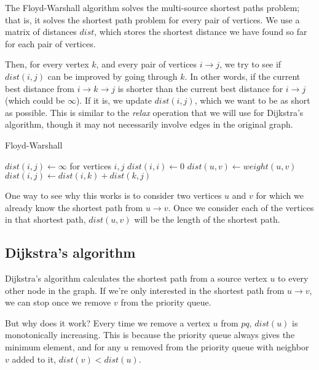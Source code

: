 The Floyd-Warshall algorithm solves the multi-source shortest paths problem; that is, it solves the shortest path problem for every pair of vertices. We use a matrix of distances $dist$, which stores the shortest distance we have found so far for each pair of vertices.

Then, for every vertex $k$, and every pair of vertices $i \rightarrow j$, we try to see if $dist(i,j)$ can be improved by going through $k$. In other words, if the current best distance from $i \rightarrow k \rightarrow j$ is shorter than the current best distance for $i \rightarrow j$ (which could be $\infty$). If it is, we update $dist(i,j)$, which we want to be as short as possible. This is similar to the \textit{relax} operation that we will use for Dijkstra's algorithm, though it may not necessarily involve edges in the original graph.

\begin{algorithm}[H]
\caption{Floyd-Warshall}
\begin{algorithmic}
\State $dist(i, j) \gets \infty$ for vertices $i, j$
    \State $dist(i,i) \gets 0$
\EndFor
{}
	\State $dist(u,v) \gets weight(u,v)$
\EndFor
{}
            	\State $dist(i,j) \gets dist(i,k)+dist(k,j)$
            \EndIf
        \EndFor
    \EndFor
\EndFor
\end{algorithmic}
\end{algorithm}

One way to see why this works is to consider two vertices $u$ and $v$ for which we already know the shortest path from $u \rightarrow v$. Once we consider each of the vertices in that shortest path, $dist(u,v)$ will be the length of the shortest path.

\subsection{Dijkstra's algorithm}
Dijkstra's algorithm calculates the shortest path from a source vertex $u$ to every other node in the graph. If we're only interested in the shortest path from $u \rightarrow v$, we can stop once we remove $v$ from the priority queue.

But why does it work? Every time we remove a vertex $u$ from $pq$, $dist(u)$ is monotonically increasing. This is because the priority queue always gives the minimum element, and for any $u$ removed from the priority queue with neighbor $v$ added to it, $dist(v) < dist(u)$.

